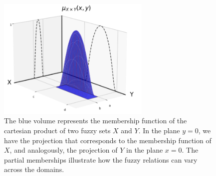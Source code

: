 \begin{figure}[ht]
    \centering
    \includegraphics[width=0.65\textwidth]{ch1/figures/fuzzy_cart_prod.png}
    \caption{The blue volume represents the membership function of the cartesian product of two fuzzy sets $X$ and $Y$. In the plane $y=0$, we have the projection that corresponds to the membership function of $X$, and analogously, the projection of $Y$ in the plane $x=0$. The partial memberships illustrate how the fuzzy relations can vary across the domains.}
    \label{fig:fuzzy_cart_prod}
\end{figure}


